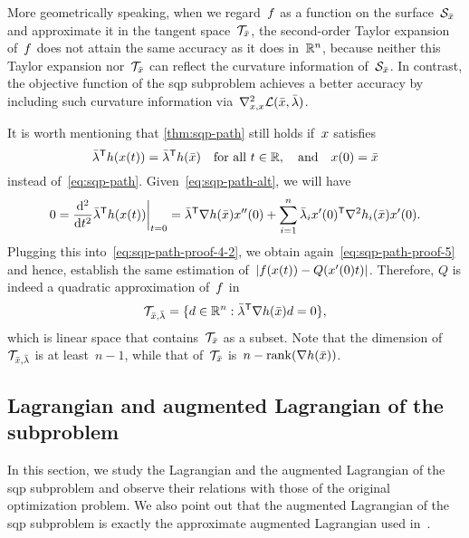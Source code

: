 More geometrically speaking, when we regard~$f$ as a function on the surface~$\mathcal{S}_{\bar{\iter}}$ and approximate it in the tangent space~$\mathcal{T}_{\bar{\iter}}$, the second-order Taylor expansion of~$f$ does not attain the same accuracy as it does in~$\mathbb{R}^n$, because neither this Taylor expansion nor~$\mathcal{T}_{\bar{\iter}}$ can reflect the curvature information
of~$\mathcal{S}_{\bar{\iter}}$.
In contrast, the objective function of the \gls{sqp} subproblem achieves a better accuracy by including such curvature information via~$\nabla_{x, x}^2 \lag(\bar{\iter}, \bar{\lm})$.

It is worth mentioning that \cref{thm:sqp-path} still holds if~$\iter$ satisfies
\begin{equation}
    \label{eq:sqp-path-alt}
    \bar{\lm}^{\T} h(\iter(t)) = \bar{\lm}^{\T} h(\bar{\iter}) \quad \text{for all~$t \in \R$}, \quad \text{and} \quad \iter(0) = \bar{\iter}
\end{equation}
instead of~\cref{eq:sqp-path}.
Given~\cref{eq:sqp-path-alt}, we will have
\begin{equation*}
    0 = \frac{\du^2}{\du t^2} \bar{\lm}^{\T} h(\iter(t)) \bigg\vert_{t = 0} = \bar{\lm}^{\T} \nabla h(\bar{\iter}) \iter''(0) + \sum_{i = 1}^n \bar{\lm}_i \iter'(0)^{\T} \nabla^2 h_i(\bar{\iter}) \iter'(0).
\end{equation*}
Plugging this into~\cref{eq:sqp-path-proof-4-2}, we obtain again~\cref{eq:sqp-path-proof-5} and hence, establish the same estimation of~$\abs{\obj(\iter(t)) - Q(x'(0) t)}$.
Therefore, $Q$ is indeed a quadratic approximation of~$f$ in
\begin{equation*}
    \mathcal{T}_{\bar{\iter}, \bar{\lm}} = \set{\step \in \R^n : \bar{\lm}^{\T} \nabla h(\bar{\iter}) \step = 0},
\end{equation*}
which is linear space that contains~$\mathcal{T}_{\bar{\iter}}$ as a subset. 
Note that the dimension of~$\mathcal{T}_{\bar{\iter}, \bar{\lm}}$ is at least~$n - 1$, while that of~$\mathcal{T}_{\bar{\iter}}$ is~$n - \rank(\nabla h(\bar{\iter}))$.

\subsection{Lagrangian and augmented Lagrangian of the  subproblem}
\label{subsec:lagrangian-augmented-lagrangian}

In this section, we study the Lagrangian and the augmented Lagrangian of the \gls{sqp} subproblem and observe their relations with those of the original optimization problem.
We also point out that the augmented Lagrangian of the \gls{sqp} subproblem is exactly the approximate augmented Lagrangian used in~\cite{Niu_Yuan_2010,Wang_Yuan_2014}.

